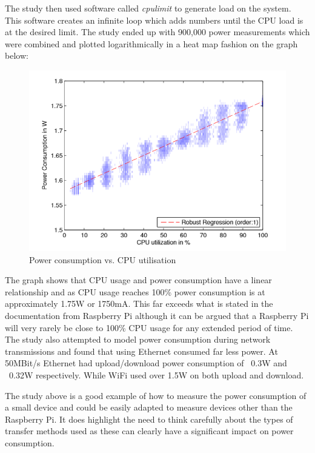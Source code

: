 \documentclass[10pt,a4paper]{article}
\begin{document}
The study then used software called \textit{cpulimit} to generate load on the system. This software creates an infinite loop which adds numbers until the CPU load is at the desired limit. The study ended up with 900,000 power measurements which were combined and plotted logarithmically in a heat map fashion on the graph below\cite{Kaup2014}:

\begin{figure}[H]
\centering
  \includegraphics[width=\linewidth]{images/powerconsumption.png}
  \caption{Power consumption vs. CPU utilisation}
  \label{fig:pwervscpu}
\end{figure}

The graph shows that CPU usage and power consumption have a linear relationship and as CPU usage reaches 100\% power consumption is at approximately 1.75W or 1750mA. This far exceeds what is stated in the documentation from Raspberry Pi although it can be argued that a Raspberry Pi will very rarely be close to 100\% CPU usage for any extended period of time. The study also attempted to model power consumption during network transmissions and found that using Ethernet consumed far less power. At 50MBit/s Ethernet had upload/download power consumption of ~0.3W and ~0.32W respectively. While WiFi used over 1.5W on both upload and download. 

The study above is a good example of how to measure the power consumption of a small device and could be easily adapted to measure devices other than the Raspberry Pi. It does highlight the need to think carefully about the types of transfer methods used as these can clearly have a significant impact on power consumption.
\end{document}
